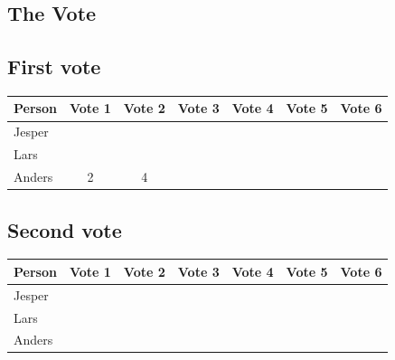 \documentclass[a4paper,10pt]{article}
\begin{document}
\subsection{The Vote}
\subsection{First vote}
\begin{tabular}{|l|c|c|c|c|c|c|}
\hline
Person & Vote 1 & Vote 2 & Vote 3 & Vote 4 & Vote 5 & Vote 6\\
\hline
Jesper& & & & & & \\
Lars& & & & & & \\
Anders&2&4& & & & \\
\hline
\end{tabular}
\subsection{Second vote}
\begin{tabular}{|l|c|c|c|c|c|c|}
\hline
Person & Vote 1 & Vote 2 & Vote 3 & Vote 4 & Vote 5 & Vote 6\\
\hline
Jesper& & & & & & \\
Lars& & & & & & \\
Anders& & & & & & \\
\hline
\end{tabular}
\end{document}
